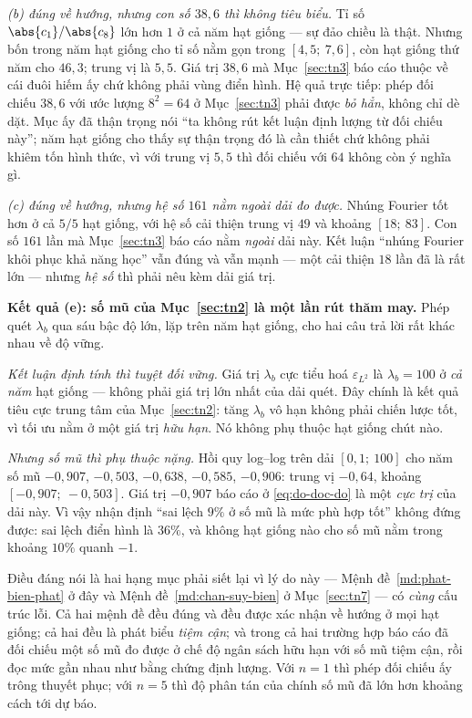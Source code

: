 \emph{(b) đúng về hướng, nhưng con số $38{,}6$ thì không tiêu biểu.} Tỉ số
$\abs{c_1}/\abs{c_8}$ lớn hơn $1$ ở cả năm hạt giống --- sự đảo chiều là thật.
Nhưng bốn trong năm hạt giống cho tỉ số nằm gọn trong $[4{,}5;\ 7{,}6]$, còn hạt
giống thứ năm cho $46{,}3$; trung vị là $5{,}5$. Giá trị $38{,}6$ mà
Mục~\ref{sec:tn3} báo cáo thuộc về cái đuôi hiếm ấy chứ không phải vùng điển
hình. Hệ quả trực tiếp: phép đối chiếu $38{,}6$ với ước lượng $8^2 = 64$ ở
Mục~\ref{sec:tn3} phải được \emph{bỏ hẳn}, không chỉ dè dặt. Mục ấy đã thận
trọng nói ``ta không rút kết luận định lượng từ đối chiếu này''; năm hạt giống
cho thấy sự thận trọng đó là cần thiết chứ không phải khiêm tốn hình thức, vì
với trung vị $5{,}5$ thì đối chiếu với $64$ không còn ý nghĩa gì.

\emph{(c) đúng về hướng, nhưng hệ số $161$ nằm ngoài dải đo được.} Nhúng Fourier
tốt hơn ở cả $5/5$ hạt giống, với hệ số cải thiện trung vị $49$ và khoảng
$[18;\ 83]$. Con số $161$ lần mà Mục~\ref{sec:tn3} báo cáo nằm \emph{ngoài} dải
này. Kết luận ``nhúng Fourier khôi phục khả năng học'' vẫn đúng và vẫn mạnh ---
một cải thiện $18$ lần đã là rất lớn --- nhưng \emph{hệ số} thì phải nêu kèm dải
giá trị.

\textbf{Kết quả (e): số mũ của Mục~\ref{sec:tn2} là một lần rút thăm may.} Phép
quét $\lambda_b$ qua sáu bậc độ lớn, lặp trên năm hạt giống, cho hai câu trả lời
rất khác nhau về độ vững.

\emph{Kết luận định tính thì tuyệt đối vững.} Giá trị $\lambda_b$ cực tiểu hoá
$\varepsilon_{L^2}$ là $\lambda_b = 100$ ở \emph{cả năm} hạt giống --- không
phải giá trị lớn nhất của dải quét. Đây chính là kết quả tiêu cực trung tâm của
Mục~\ref{sec:tn2}: tăng $\lambda_b$ vô hạn không phải chiến lược tốt, vì tối ưu
nằm ở một giá trị \emph{hữu hạn}. Nó không phụ thuộc hạt giống chút nào.

\emph{Nhưng số mũ thì phụ thuộc nặng.} Hồi quy log--log trên dải
$[0{,}1;\ 100]$ cho năm số mũ $-0{,}907$, $-0{,}503$, $-0{,}638$, $-0{,}585$,
$-0{,}906$: trung vị $-0{,}64$, khoảng $[-0{,}907;\ -0{,}503]$. Giá trị
$-0{,}907$ báo cáo ở \eqref{eq:do-doc-do} là một \emph{cực trị} của dải này. Vì
vậy nhận định ``sai lệch $9\%$ ở số mũ là mức phù hợp tốt'' không đứng được:
sai lệch điển hình là $36\%$, và không hạt giống nào cho số mũ nằm trong khoảng
$10\%$ quanh $-1$.

Điều đáng nói là hai hạng mục phải siết lại vì lý do này ---
Mệnh đề~\ref{md:phat-bien-phat} ở đây và Mệnh đề~\ref{md:chan-suy-bien} ở
Mục~\ref{sec:tn7} --- có \emph{cùng} cấu trúc lỗi. Cả hai mệnh đề đều đúng và
đều được xác nhận về hướng ở mọi hạt giống; cả hai đều là phát biểu
\emph{tiệm cận}; và trong cả hai trường hợp báo cáo đã đối chiếu một số mũ đo
được ở chế độ ngân sách hữu hạn với số mũ tiệm cận, rồi đọc mức gần nhau như
bằng chứng định lượng. Với $n = 1$ thì phép đối chiếu ấy trông thuyết phục; với
$n = 5$ thì độ phân tán của chính số mũ đã lớn hơn khoảng cách tới dự báo.


